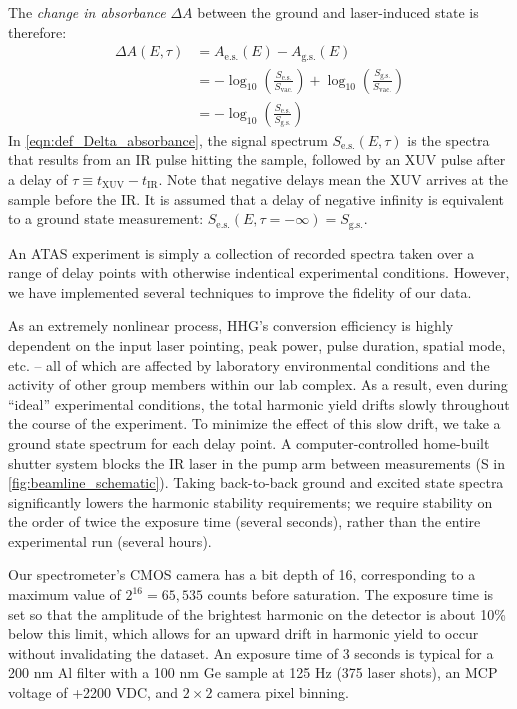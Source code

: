 The \textit{change in absorbance} $\Delta A$ between the ground and laser-induced state is therefore:
\begin{equation}
\begin{aligned}
\Delta A(E,\tau) &= A_{\textrm{e.s.}}(E) - A_{\textrm{g.s.}}(E)\\
&= - \log_{10} \left( \frac{S_{\textrm{e.s.}}}{S_{\textrm{vac.}}} \right) + \log_{10} \left( \frac{S_{\textrm{g.s.}}}{S_{\textrm{vac.}}} \right)\\
&= - \log_{10} \left( \frac{S_{\textrm{e.s.}}}{S_{\textrm{g.s.}}} \right)
\end{aligned}
\label{eqn:def_Delta_absorbance}
\end{equation}
In \cref{eqn:def_Delta_absorbance}, the signal spectrum $S_{\textrm{e.s.}}(E, \tau)$ is the spectra that results from an IR pulse hitting the sample, followed by an XUV pulse after a delay of $\tau \equiv t_{\textrm{XUV}} - t_{\textrm{IR}}$. Note that negative delays mean the XUV arrives at the sample before the IR. It is assumed that a delay of negative infinity is equivalent to a ground state measurement: $S_{\textrm{e.s.}}(E, \tau = - \infty) = S_{\textrm{g.s.}}$.

An ATAS experiment is simply a collection of recorded spectra taken over a range of delay points with otherwise indentical experimental conditions. However, we have implemented several techniques to improve the fidelity of our data.

As an extremely nonlinear process, HHG's conversion efficiency is highly dependent on the input laser pointing, peak power, pulse duration, spatial mode, etc. -- all of which are affected by laboratory environmental conditions and the activity of other group members within our lab complex. As a result, even during ``ideal'' experimental conditions, the total harmonic yield drifts slowly throughout the course of the experiment. To minimize the effect of this slow drift, we take a ground state spectrum for each delay point. A computer-controlled home-built shutter system blocks the IR laser in the pump arm between measurements (S in \cref{fig:beamline_schematic}). Taking back-to-back ground and excited state spectra significantly lowers the harmonic stability requirements; we require stability on the order of twice the exposure time (several seconds), rather than the entire experimental run (several hours).

Our spectrometer's CMOS camera has a bit depth of 16, corresponding to a maximum value of $2^{16} = 65,535$ counts before saturation. The exposure time is set so that the amplitude of the brightest harmonic on the detector is about 10\% below this limit, which allows for an upward drift in harmonic yield to occur without invalidating the dataset. An exposure time of 3 seconds is typical for a 200 nm Al filter with a 100 nm Ge sample at 125 Hz (375 laser shots), an MCP voltage of +2200 VDC, and $2 \times 2$ camera pixel binning.

